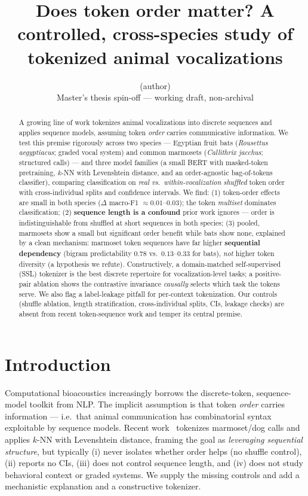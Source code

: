 \documentclass[10pt,twocolumn]{article}
\title{\vspace{-2em}Does token order matter? A controlled, cross-species study of
tokenized animal vocalizations}
\author{(author) \\ \small Master's thesis spin-off --- working draft, non-archival}
\date{}
\begin{document}
\maketitle

\begin{abstract}
\small
A growing line of work tokenizes animal vocalizations into discrete sequences and
applies sequence models, assuming token \emph{order} carries communicative
information. We test this premise rigorously across two species --- Egyptian fruit bats
(\textit{Rousettus aegyptiacus}; graded vocal system) and common marmosets
(\textit{Callithrix jacchus}; structured calls) --- and three model families (a small
BERT with masked-token pretraining, $k$-NN with Levenshtein distance, and an
order-agnostic bag-of-tokens classifier), comparing classification on \emph{real vs.\
within-vocalization shuffled} token order with cross-individual splits and confidence
intervals. We find: (1) token-order effects are small in both species ($\Delta$
macro-F1 $\approx 0.01$--$0.03$); the token \emph{multiset} dominates classification;
(2) \textbf{sequence length is a confound} prior work ignores --- order is
indistinguishable from shuffled at short sequences in both species; (3) pooled,
marmosets show a small but significant order benefit while bats show none, explained by
a clean mechanism: marmoset token sequences have far higher \textbf{sequential
dependency} (bigram predictability $0.78$ vs.\ $0.13$--$0.33$ for bats), \emph{not}
higher token diversity (a hypothesis we refute). Constructively, a domain-matched
self-supervised (SSL) tokenizer is the best discrete repertoire for vocalization-level
tasks; a positive-pair ablation shows the contrastive invariance \emph{causally}
selects which task the tokens serve. We also flag a label-leakage pitfall for
per-context tokenization. Our controls (shuffle ablation, length stratification,
cross-individual splits, CIs, leakage checks) are absent from recent token-sequence
work and temper its central premise.
\end{abstract}

\section{Introduction}
Computational bioacoustics increasingly borrows the discrete-token, sequence-model
toolkit from NLP. The implicit assumption is that token \emph{order} carries
information --- i.e.\ that animal communication has combinatorial syntax exploitable by
sequence models. Recent work~\cite{sarkar2025} tokenizes marmoset/dog calls and applies
$k$-NN with Levenshtein distance, framing the goal as \emph{leveraging sequential
structure}, but typically (i) never isolates whether order helps (no shuffle control),
(ii) reports no CIs, (iii) does not control sequence length, and (iv) does not study
behavioral context or graded systems. We supply the missing controls and add a
mechanistic explanation and a constructive tokenizer.
\end{document}
